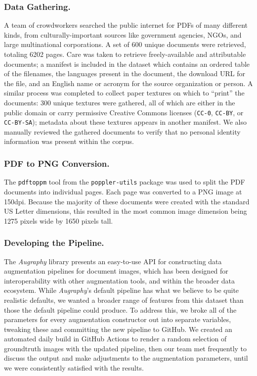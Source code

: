 \documentclass[runningheads]{llncs}
\begin{document}
\subsubsection{Data Gathering.}
A team of crowdworkers searched the public internet for PDFs of many different kinds, from culturally-important sources like government agencies, NGOs, and large multinational corporations.
A set of 600 unique documents were retrieved, totaling 6202 pages.
Care was taken to retrieve freely-available and attributable documents; a manifest is included in the dataset which contains an ordered table of the filenames, the languages present in the document, the download URL for the file, and an English name or acronym for the source organization or person.
A similar process was completed to collect paper textures on which to ``print'' the documents: 300 unique textures were gathered, all of which are either in the public domain or carry permissive Creative Commons licenses (\texttt{CC-0}, \texttt{CC-BY}, or \texttt{CC-BY-SA}); metadata about these textures appears in another manifest.
We also manually reviewed the gathered documents to verify that no personal identity information was present within the corpus.

\subsubsection{PDF to PNG Conversion.}
The \texttt{pdftoppm} tool from the \texttt{poppler-utils} package was used to split the PDF documents into individual pages.
Each page was converted to a PNG image at 150dpi.
Because the majority of these documents were created with the standard US Letter dimensions, this resulted in the most common image dimension being 1275 pixels wide by 1650 pixels tall.

\subsubsection{Developing the Pipeline.}
The \emph{Augraphy} library presents an easy-to-use API for constructing data augmentation pipelines for document images, which has been designed for interoperability with other augmentation tools, and within the broader data ecosystem.
While \emph{Augraphy}'s default pipeline has what we believe to be quite realistic defaults, we wanted a broader range of features from this dataset than those the default pipeline could produce.
To address this, we broke all of the parameters for every augmentation constructor out into separate variables, tweaking these and committing the new pipeline to GitHub.
We created an automated daily build in GitHub Actions to render a random selection of groundtruth images with the updated pipeline, then our team met frequently to discuss the output and make adjustments to the augmentation parameters, until we were consistently satisfied with the results.
\end{document}
